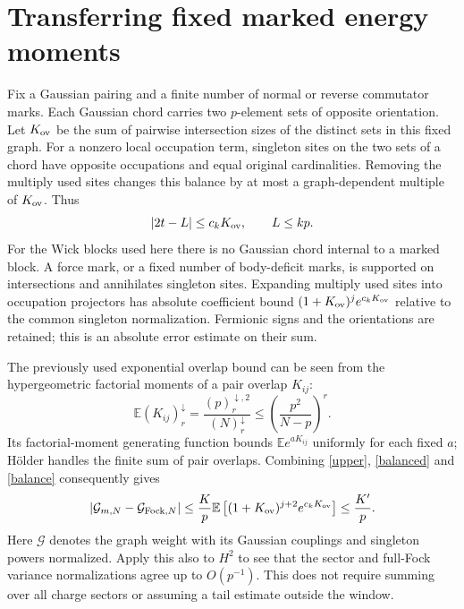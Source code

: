 \documentclass[11pt,a4paper]{article}
\newcommand{\EE}{\mathbb E}
\begin{document}
\section{Transferring fixed marked energy moments}
Fix a Gaussian pairing and a finite number of normal or reverse
commutator marks. Each Gaussian chord carries two $p$-element sets
of opposite orientation. Let $K_{\rm ov}$ be the sum of pairwise
intersection sizes of the distinct sets in this fixed graph.
For a nonzero local occupation term, singleton sites on the two
sets of a chord have opposite occupations and equal original
cardinalities. Removing the multiply used sites changes this
balance by at most a graph-dependent multiple of $K_{\rm ov}$.
Thus
\begin{equation}
 |2t-L|\le c_kK_{\rm ov},\qquad L\le kp.\label{balance}
\end{equation}
For the Wick blocks used here there is no Gaussian chord internal
to a marked block. A force mark, or a fixed number of body-deficit
marks, is supported on intersections and annihilates singleton
sites. Expanding multiply used sites into occupation projectors
has absolute coefficient bound
$(1+K_{\rm ov})^j e^{c_kK_{\rm ov}}$ relative to the common
singleton normalization. Fermionic signs and the orientations are
retained; this is an absolute error estimate on their sum.

The previously used exponential overlap bound can be seen from
the hypergeometric factorial moments of a pair overlap $K_{ij}$:
\begin{equation}
 \EE(K_{ij})_r^\downarrow
 =\frac{(p)_r^{\downarrow,2}}{(N)_r^\downarrow}
 \le\left(\frac{p^2}{N-p}\right)^r.
\end{equation}
Its factorial-moment generating function bounds
$\EE e^{aK_{ij}}$ uniformly for each fixed $a$; H\"older handles
the finite sum of pair overlaps. Combining \eqref{upper},
\eqref{balanced} and \eqref{balance} consequently gives
\begin{equation}
 \left|\mathcal G_{m,N}-\mathcal G_{{\rm Fock},N}\right|
 \le\frac Kp\EE\left[(1+K_{\rm ov})^{j+2}e^{c_kK_{\rm ov}}\right]
 \le\frac{K'}p.\label{graph}
\end{equation}
Here $\mathcal G$ denotes the graph weight with its Gaussian
couplings and singleton powers normalized. Apply this also to
$H^2$ to see that the sector and full-Fock variance normalizations
agree up to $O(p^{-1})$. This does not require summing over all
charge sectors or assuming a tail estimate outside the window.
\end{document}
